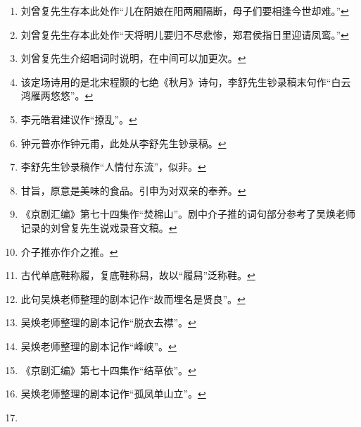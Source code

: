 \begin{enumerate}
\item
  \leavevmode\hypertarget{fn28}{}%
  刘曾复先生存本此处作``儿在阴娘在阳两厢隔断，母子们要相逢今世却难。''\protect\hyperlink{fnref28}{↩}
\item
  \leavevmode\hypertarget{fn29}{}%
  刘曾复先生存本此处作``天将明儿要归不尽悲惨，郑君侯指日里迎请凤鸾。''\protect\hyperlink{fnref29}{↩}
\item
  \leavevmode\hypertarget{fn30}{}%
  刘曾复先生介绍唱词时说明，在中间可以加更次。\protect\hyperlink{fnref30}{↩}
\item
  \leavevmode\hypertarget{fn31}{}%
  该定场诗用的是北宋程颢的七绝《秋月》诗句，李舒先生钞录稿末句作``白云鸿雁两悠悠''。\protect\hyperlink{fnref31}{↩}
\item
  \leavevmode\hypertarget{fn32}{}%
  李元皓君建议作``撩乱''。\protect\hyperlink{fnref32}{↩}
\item
  \leavevmode\hypertarget{fn33}{}%
  钟元普亦作钟元甫，此处从李舒先生钞录稿。\protect\hyperlink{fnref33}{↩}
\item
  \leavevmode\hypertarget{fn34}{}%
  李舒先生钞录稿作``人情付东流''，似非。\protect\hyperlink{fnref34}{↩}
\item
  \leavevmode\hypertarget{fn35}{}%
  甘旨，原意是美味的食品。引申为对双亲的奉养。\protect\hyperlink{fnref35}{↩}
\item
  \leavevmode\hypertarget{fn36}{}%
  《京剧汇编》第七十四集作``焚棉山''。剧中介子推的词句部分参考了吴焕老师记录的刘曾复先生说戏录音文稿。\protect\hyperlink{fnref36}{↩}
\item
  \leavevmode\hypertarget{fn37}{}%
  介子推亦作介之推。\protect\hyperlink{fnref37}{↩}
\item
  \leavevmode\hypertarget{fn38}{}%
  古代单底鞋称履，复底鞋称舄，故以``履舄''泛称鞋。\protect\hyperlink{fnref38}{↩}
\item
  \leavevmode\hypertarget{fn39}{}%
  此句吴焕老师整理的剧本记作``故而埋名是贤良''。\protect\hyperlink{fnref39}{↩}
\item
  \leavevmode\hypertarget{fn40}{}%
  吴焕老师整理的剧本记作``脱衣去襟''。\protect\hyperlink{fnref40}{↩}
\item
  \leavevmode\hypertarget{fn41}{}%
  吴焕老师整理的剧本记作``峰峡''。\protect\hyperlink{fnref41}{↩}
\item
  \leavevmode\hypertarget{fn42}{}%
  《京剧汇编》第七十四集作``结草依''。\protect\hyperlink{fnref42}{↩}
\item
  \leavevmode\hypertarget{fn43}{}%
  吴焕老师整理的剧本记作``孤凤单山立''。\protect\hyperlink{fnref43}{↩}
\item

\end{enumerate}
